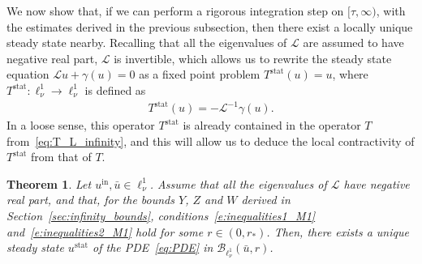\documentclass[10pt,a4paper]{article}
\theoremstyle{plain}
\newtheorem{theorem}{Theorem}[section]
\newcommand{\B}{\mathcal{B}}
\renewcommand{\B}{\mathcal{B}}
\renewcommand{\L}{\mathcal{L}}
\newcommand{\bu}{\bar{u}}
\newcommand{\1}{\mathbf{1}}
\newcommand{\rstar}{r_*}
\newcommand{\uin}{{u^{\mathrm{in}}}}
\newcommand{\stat}{\mathrm{stat}}
\begin{document}
We now show that, if we can perform a rigorous integration step on $[\tau,\infty)$, with the estimates derived in the previous subsection, then there exist a locally unique steady state nearby. Recalling that all the eigenvalues of $\L$ are assumed to have negative real part, $\L$ is invertible, which allows us to rewrite the steady state equation $\L u + \gamma(u) = 0$ as a fixed point problem $T^\stat(u) = u$, where $T^{\stat}:\ell^1_\nu\to\ell^1_\nu$ is defined as
\begin{align*}
T^\stat(u) = -\L^{-1}\gamma(u).
\end{align*}
In a loose sense, this operator $T^\stat$ is already contained in the operator $T$ from~\eqref{eq:T_L_infinity}, and this will allow us to deduce the local contractivity of $T^\stat$ from that of $T$.
%
\begin{theorem}
\label{thm:steadystate}
Let $\uin,\bu\in\ell^1_\nu$. Assume that all the eigenvalues of $\L$ have negative real part, and that, for the bounds $Y$, $Z$ and $W$ derived in Section~\ref{sec:infinity_bounds},  conditions~\eqref{e:inequalities1_M1} and~\eqref{e:inequalities2_M1} hold for some $r\in(0,\rstar)$. Then, there exists a unique steady state $u^\stat$ of the PDE~\eqref{eq:PDE} in $\B_{\ell^1_\nu}(\bu,r)$.
\end{theorem}
%
\end{document}
